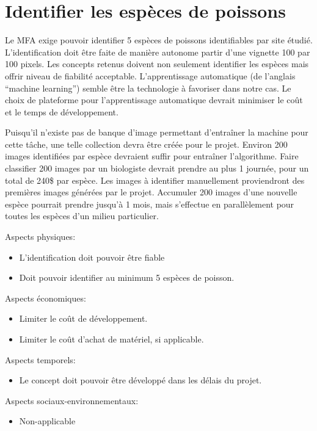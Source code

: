 

\section{Identifier les espèces de poissons}
\label{s:faisab_identifier}
Le MFA exige pouvoir identifier 5 espèces de poissons identifiables par site étudié. L’identification doit être faite de manière autonome partir d’une vignette 100 par 100 pixels. Les concepts retenus doivent non seulement identifier les espèces mais offrir niveau de fiabilité acceptable. L’apprentissage automatique (de l’anglais “machine learning”) semble être la technologie à favoriser dans notre cas. Le choix de plateforme pour l’apprentissage automatique devrait minimiser le coût et le temps de développement.

Puisqu’il n’existe pas de banque d’image permettant d’entraîner la machine pour cette tâche, une telle collection devra être créée pour le projet. Environ 200 images identifiées par espèce devraient suffir pour entraîner l’algorithme.\cite{deeplearn_2015, fishID_2016} Faire classifier 200 images par un biologiste devrait prendre au plus 1 journée, pour un total de 240\$ \cite{sal_biologiste} par espèce. Les images à identifier manuellement proviendront des premières images générées par le projet. Accumuler 200 images d’une nouvelle espèce pourrait prendre jusqu’à 1 mois, mais s’effectue en parallèlement pour toutes les espèces d’un milieu particulier.

Aspects physiques:
\begin{itemize}
	\item L’identification doit pouvoir être fiable
	\item Doit pouvoir identifier au minimum 5 espèces de poisson.
\end{itemize}

Aspects économiques:
\begin{itemize}
	\item Limiter le coût de développement.
	\item Limiter le coût d’achat de matériel, si applicable.
\end{itemize}

Aspects temporels:
\begin{itemize}
	\item Le concept doit pouvoir être développé dans les délais du projet.
\end{itemize}

Aspects sociaux-environnementaux:
\begin{itemize}
	\item Non-applicable
\end{itemize}







